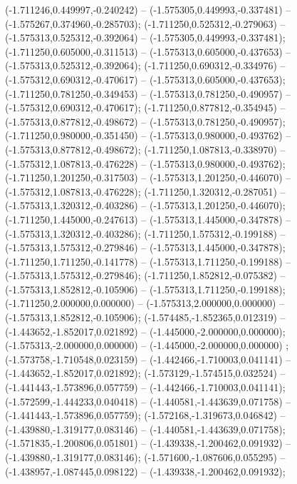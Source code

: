  (-1.711246,0.449997,-0.240242) -- (-1.575305,0.449993,-0.337481) -- (-1.575267,0.374960,-0.285703);
 (-1.711250,0.525312,-0.279063) -- (-1.575313,0.525312,-0.392064) -- (-1.575305,0.449993,-0.337481);
 (-1.711250,0.605000,-0.311513) -- (-1.575313,0.605000,-0.437653) -- (-1.575313,0.525312,-0.392064);
 (-1.711250,0.690312,-0.334976) -- (-1.575312,0.690312,-0.470617) -- (-1.575313,0.605000,-0.437653);
 (-1.711250,0.781250,-0.349453) -- (-1.575313,0.781250,-0.490957) -- (-1.575312,0.690312,-0.470617);
 (-1.711250,0.877812,-0.354945) -- (-1.575313,0.877812,-0.498672) -- (-1.575313,0.781250,-0.490957);
 (-1.711250,0.980000,-0.351450) -- (-1.575313,0.980000,-0.493762) -- (-1.575313,0.877812,-0.498672);
 (-1.711250,1.087813,-0.338970) -- (-1.575312,1.087813,-0.476228) -- (-1.575313,0.980000,-0.493762);
 (-1.711250,1.201250,-0.317503) -- (-1.575313,1.201250,-0.446070) -- (-1.575312,1.087813,-0.476228);
 (-1.711250,1.320312,-0.287051) -- (-1.575313,1.320312,-0.403286) -- (-1.575313,1.201250,-0.446070);
 (-1.711250,1.445000,-0.247613) -- (-1.575313,1.445000,-0.347878) -- (-1.575313,1.320312,-0.403286);
 (-1.711250,1.575312,-0.199188) -- (-1.575313,1.575312,-0.279846) -- (-1.575313,1.445000,-0.347878);
 (-1.711250,1.711250,-0.141778) -- (-1.575313,1.711250,-0.199188) -- (-1.575313,1.575312,-0.279846);
 (-1.711250,1.852812,-0.075382) -- (-1.575313,1.852812,-0.105906) -- (-1.575313,1.711250,-0.199188);
 (-1.711250,2.000000,0.000000) -- (-1.575313,2.000000,0.000000) -- (-1.575313,1.852812,-0.105906);
 (-1.574485,-1.852365,0.012319) -- (-1.443652,-1.852017,0.021892) -- (-1.445000,-2.000000,0.000000);
 (-1.575313,-2.000000,0.000000) -- (-1.445000,-2.000000,0.000000) ;
 (-1.573758,-1.710548,0.023159) -- (-1.442466,-1.710003,0.041141) -- (-1.443652,-1.852017,0.021892);
 (-1.573129,-1.574515,0.032524) -- (-1.441443,-1.573896,0.057759) -- (-1.442466,-1.710003,0.041141);
 (-1.572599,-1.444233,0.040418) -- (-1.440581,-1.443639,0.071758) -- (-1.441443,-1.573896,0.057759);
 (-1.572168,-1.319673,0.046842) -- (-1.439880,-1.319177,0.083146) -- (-1.440581,-1.443639,0.071758);
 (-1.571835,-1.200806,0.051801) -- (-1.439338,-1.200462,0.091932) -- (-1.439880,-1.319177,0.083146);
 (-1.571600,-1.087606,0.055295) -- (-1.438957,-1.087445,0.098122) -- (-1.439338,-1.200462,0.091932);
